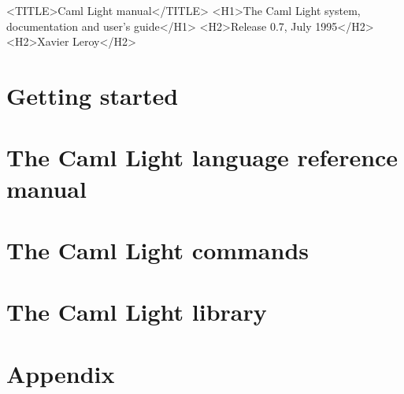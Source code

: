 \begin{rawhtml}
  <TITLE>Caml Light manual</TITLE>
  <H1>The Caml Light system, documentation and user's guide</H1>
  <H2>Release 0.7, July 1995</H2>
  <H2>Xavier Leroy</H2>
\end{rawhtml}



\part{Getting started} \label{p:gettingstarted}


\part{The Caml Light language reference manual} \label{p:refman}



\part{The Caml Light commands} \label{p:commands}










\part{The Caml Light library} \label{p:library}







\part{Appendix} \label{p:appendix}

